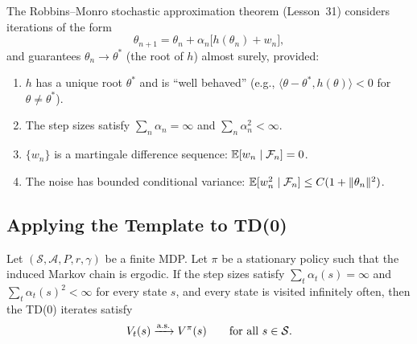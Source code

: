 \documentclass[11pt,a4paper]{article}
\begin{document}
The Robbins--Monro stochastic approximation theorem
(Lesson~31) considers iterations of the form
\begin{equation}
  \theta_{n+1} = \theta_n + \alpha_n
    \bigl[h(\theta_n) + w_n\bigr],
  \label{eq:rm}
\end{equation}
and guarantees $\theta_n \to \theta^*$ (the root of $h$)
almost surely, provided:
\begin{enumerate}[label=(RM\arabic*)]
  \item $h$ has a unique root $\theta^*$ and is ``well
    behaved'' (e.g., $\langle \theta - \theta^*,
    h(\theta) \rangle < 0$ for $\theta \neq \theta^*$).
    \label{rm:drift}
  \item The step sizes satisfy $\sum_n \alpha_n = \infty$
    and $\sum_n \alpha_n^2 < \infty$.
    \label{rm:step}
  \item $\{w_n\}$ is a martingale difference sequence:
    $\mathbb{E}[w_n \mid \mathcal{F}_n] = 0$.
    \label{rm:mds}
  \item The noise has bounded conditional variance:
    $\mathbb{E}[w_n^2 \mid \mathcal{F}_n]
    \leq C(1 + \|\theta_n\|^2)$.
    \label{rm:var}
\end{enumerate}

\subsection{Applying the Template to TD(0)}

\begin{theorem}[Convergence of TD(0)]
\label{thm:td_convergence}
Let $(\mathcal{S}, \mathcal{A}, P, r, \gamma)$ be a finite
MDP.  Let $\pi$ be a stationary policy such that the induced
Markov chain is ergodic.  If the step sizes satisfy
$\sum_t \alpha_t(s) = \infty$ and
$\sum_t \alpha_t(s)^2 < \infty$ for every state $s$, and
every state is visited infinitely often, then the TD(0)
iterates satisfy
\begin{equation}
  V_t(s) \xrightarrow{\text{a.s.}} V^\pi(s)
  \qquad \text{for all } s \in \mathcal{S}.
  \label{eq:td_convergence}
\end{equation}
\end{theorem}
\end{document}
